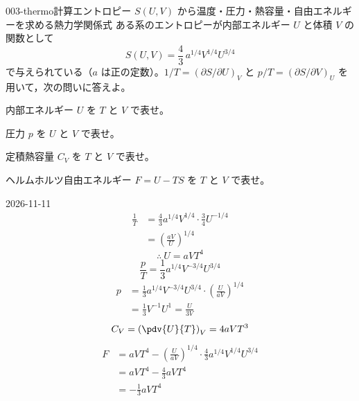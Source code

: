 \documentclass[uplatex,dvipdfmx,a4paper,11pt]{jsarticle}
\begin{document}
\mondaihen
{}
\begin{mondai}{003-thermo}{計算}{エントロピー $S(U,V)$ から温度・圧力・熱容量・自由エネルギーを求める熱力学関係式}
ある系のエントロピーが内部エネルギー $U$ と体積 $V$ の関数として
\[S(U,V)=\frac{4}{3}\,a^{1/4}V^{1/4}U^{3/4}\]
で与えられている（$a$ は正の定数）。$1/T=(\partial S/\partial U)_{V}$ と $p/T=(\partial S/\partial V)_{U}$ を用いて，次の問いに答えよ。
\begin{shoumon}
  \item 内部エネルギー $U$ を $T$ と $V$ で表せ。
  \item 圧力 $p$ を $U$ と $V$ で表せ。
  \item 定積熱容量 $C_{V}$ を $T$ と $V$ で表せ。
  \item ヘルムホルツ自由エネルギー $F=U-TS$ を $T$ と $V$ で表せ。
\end{shoumon}
\begin{kotaeutsushi}{2026-11-11}
\begin{align*}
\frac{1}{T}&=\frac{4}{3}a^{1/4}V^{1/4}\cdot\frac{3}{4}U^{-1/4}\\
&=\left(\frac{aV}{U}\right)^{1/4}
\end{align*}
\[ \therefore\ U=aVT^{4} \]
\[ \frac{p}{T}=\frac{1}{3}a^{1/4}V^{-3/4}U^{3/4} \]
\begin{align*}
p&=\frac{1}{3}a^{1/4}V^{-3/4}U^{3/4}\cdot\left(\frac{U}{aV}\right)^{1/4}\\
&=\frac{1}{3}V^{-1}U^{1}=\frac{U}{3V}
\end{align*}
\[ C_{V}=\left(\pdv{U}{T}\right)_{V}=4aVT^{3} \]
\begin{align*}
F&=aVT^{4}-\left(\frac{U}{aV}\right)^{1/4}\cdot\frac{4}{3}a^{1/4}V^{1/4}U^{3/4}\\
&=aVT^{4}-\frac{4}{3}aVT^{4}\\
&=-\frac{1}{3}aVT^{4}
\end{align*}
\end{kotaeutsushi}
\end{mondai}
\end{document}
